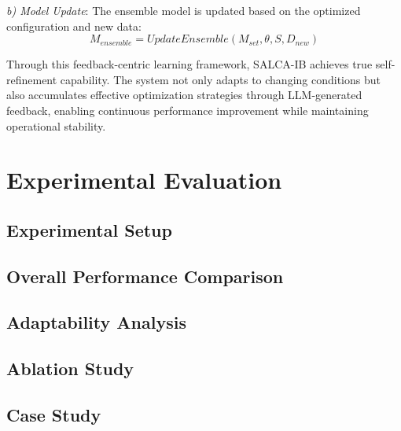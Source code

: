\documentclass[conference]{IEEEtran}
\begin{document}
\textit{b) Model Update}: The ensemble model is updated based on the optimized configuration and new data:
\begin{equation}
    M_{ensemble} = UpdateEnsemble(M_{set}, \theta, S, D_{new})
\end{equation}

Through this feedback-centric learning framework, SALCA-IB achieves true self-refinement capability. The system not only adapts to changing conditions but also accumulates effective optimization strategies through LLM-generated feedback, enabling continuous performance improvement while maintaining operational stability.



\section{Experimental Evaluation}

\subsection{Experimental Setup}

\subsection{Overall Performance Comparison}

\subsection{Adaptability Analysis}

\subsection{Ablation Study}

\subsection{Case Study}
\end{document}
